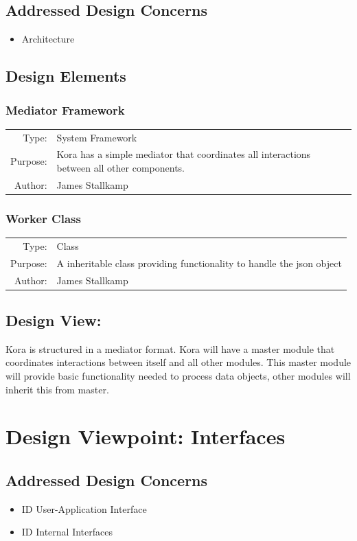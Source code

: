 \documentclass[onecolumn, draftclsnofoot,10pt, compsoc]{IEEEtran}
\def \botname{Kora\xspace}
\newcommand{\designConcernRef}[2][]{
    #2 #1
}
\newcommand{\designElementDef}[4]{
    \subsubsection{#1}
    \begin{tabular}[t]{r p{6in}}
        Type: & #2 \\
        Purpose: & #3 \\
        Author: & #4 \\
    \end{tabular}
}
\begin{document}
    \subsection{Addressed Design Concerns}
        \begin{itemize}
            \item \designConcernRef[]{Architecture}
        \end{itemize}

    \subsection{Design Elements}
		\designElementDef{Mediator Framework}
						 {System Framework}
						 {\botname has a simple mediator that coordinates all interactions between all other components.}
						 {James Stallkamp}
		\designElementDef{Worker Class}
						 {Class}
						 {A inheritable class providing functionality to handle the json object}
						 {James Stallkamp}				 
    \subsection{Design View: }
		\botname is structured in a mediator format. 
		\botname will have a master module that coordinates interactions between itself and all other modules.
		This master module will provide basic functionality needed to process data objects, other modules will inherit this from master. 


\section{Design Viewpoint: Interfaces}
    \subsection{Addressed Design Concerns}
        \begin{itemize}
            \item \designConcernRef[User-Application Interface]{ID}
            \item \designConcernRef[Internal Interfaces]{ID}
        \end{itemize}
\end{document}
